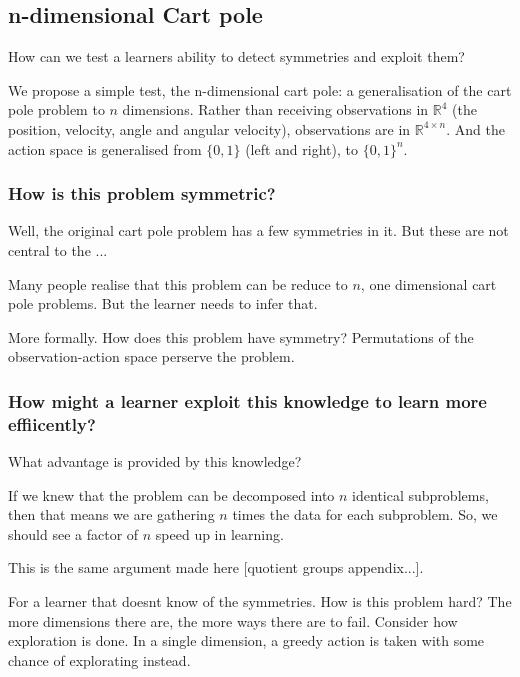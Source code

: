 \subsection{n-dimensional Cart pole}

\begin{displayquote}
How can we test a learners ability to detect symmetries and exploit them?
\end{displayquote}

We propose a simple test, the n-dimensional cart pole: a generalisation of the
cart pole problem to $n$ dimensions. Rather than receiving observations in
$\mathbb{R}^4$ (the position, velocity, angle and angular velocity), observations are
in $\mathbb{R}^{4\times n}$. And the action space is generalised from $\{0,1\}$ (left and right),
to $\{0,1\}^{n}$.

\cite{Brockman2016,baselines}


\subsubsection{How is this problem symmetric?}

Well, the original cart pole problem has a few symmetries in it. But these are
not central to the ...

Many people realise that this problem can be reduce to $n$, one dimensional cart pole problems.
But the learner needs to infer that.

More formally. How does this problem have symmetry?
Permutations of the observation-action space perserve the problem.

\subsubsection{How might a learner exploit this knowledge to learn more effiicently?}

What advantage is provided by this knowledge?

If we knew that the problem can be decomposed into $n$ identical subproblems,
then that means we are gathering $n$ times the data for each subproblem.
So, we should see a factor of $n$ speed up in learning.

This is the same argument made here [quotient groups appendix...].

For a learner that doesnt know of the symmetries. How is this problem hard?
The more dimensions there are, the more ways there are to fail.
Consider how exploration is done. In a single dimension, a greedy action is
taken with some chance of explorating instead.

